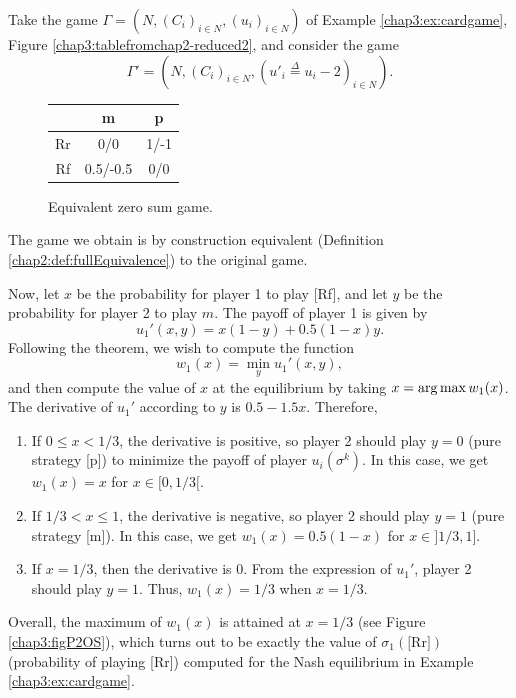 \begin{example}
Take the game $\Gamma = (N, (C_i)_{i \in N}, (u_i)_{i \in N})$ of 
 Example \ref{chap3:ex:cardgame}, Figure \ref{chap3:tablefromchap2-reduced2}, 
 and consider the game $$\Gamma' = (N, (C_i)_{i \in N}, (u'_i \overset{\Delta}{ =} u_i-2)_{i \in N}).$$

\begin{figure}[!ht]
\centering
\begin{tabular}{c|cc}
 & m & p \\
\hline
Rr & 0/0 & 1/-1 \\
Rf & 0.5/-0.5 & 0/0
\end{tabular}
\caption{Equivalent zero sum game. }
\label{chap3:tablefromchap2-eq0sum}
\end{figure}
The game we obtain is by construction equivalent (Definition \ref{chap2:def:fullEquivalence}) to the original game.

Now, let $x$ be the probability for player 1 to play [Rf], and let $y$  be the probability for player 2 to play $m$.  The payoff of player 1 is given by
$$u_1'(x,y) = x(1-y) + 0.5 (1-x)y. $$
Following the theorem, we wish to compute the function 
$$ w_1(x) = \min_{y} u_1'(x,y),$$
and then compute the value of $x$ at the equilibrium by taking $x = \operatorname*{arg\,max} w_1(x)$. 
The derivative of $u_1'$ according to $y$ is $0.5 - 1.5 x$. Therefore, 
\begin{enumerate}
\item If $0 \leq x < 1/3$, the derivative is positive, so player 2 should play $y = 0$ (pure strategy [p]) to minimize the payoff of player $u_i(\sigma^k)$.
In this case, we get $w_1(x) = x$ for $x \in [0, 1/3[$.
\item If $1/3 < x \leq 1$, the derivative is negative, so player 2 should play $y = 1$ (pure strategy [m]).
In this case, we get $w_1(x) = 0.5(1-x)$ for $x \in ]1/3, 1]$.
\item If $x = 1/3$, then the derivative is 0. From the expression of $u_1'$, player 2 should play $y = 1$. Thus, $w_1(x) = 1/3$ when $x = 1/3$.
\end{enumerate}

Overall, the maximum of $w_1(x)$ is attained at $x = 1/3$ (see Figure \ref{chap3:figP2OS}),  which turns out to be exactly the value of $\sigma_1(\text{[Rr]})$ (probability of playing [Rr]) computed for the Nash equilibrium in Example \ref{chap3:ex:cardgame}. 




\end{example}

